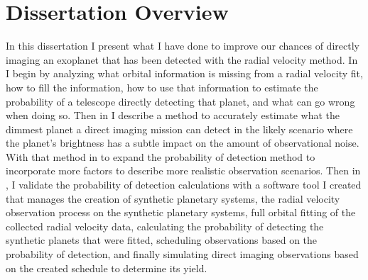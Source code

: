 \section{Dissertation Overview}
\label{sec:dis_overview}

In this dissertation I present what I have done to improve our chances of
directly imaging an exoplanet that has been detected with the radial velocity
method. In  I begin by analyzing what orbital information
is missing from a radial velocity fit, how to fill the information, how to use
that information to estimate the probability of a telescope directly detecting
that planet, and what can go wrong when doing so. Then in  I
describe a method to accurately estimate what the dimmest planet a direct
imaging mission can detect in the likely scenario where the planet's brightness
has a subtle impact on the amount of observational noise. With that method in
 to expand the probability of detection method to
incorporate more factors to describe more realistic observation scenarios. Then
in , I validate the probability of detection
calculations with a software tool I created that manages the creation of
synthetic planetary systems, the radial velocity observation process on the
synthetic planetary systems, full orbital fitting of the collected radial
velocity data, calculating the probability of detecting the synthetic planets
that were fitted, scheduling observations based on the probability of
detection, and finally simulating direct imaging observations based on the
created schedule to determine its yield.


